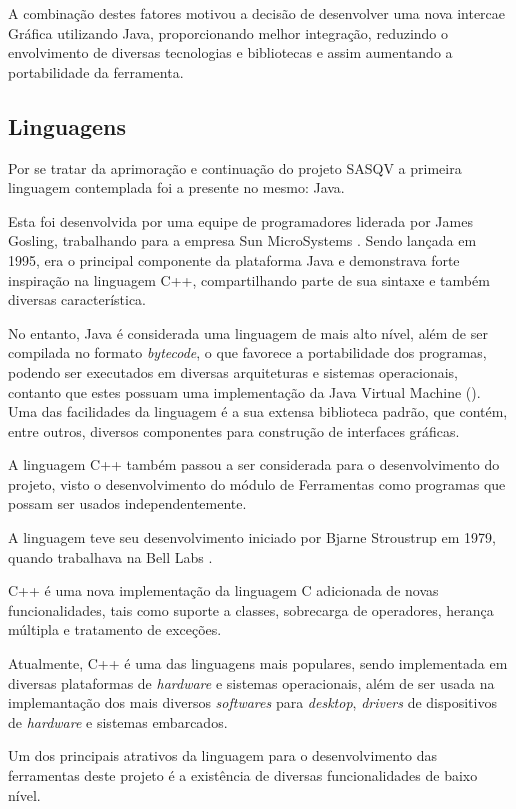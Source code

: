 A combinação destes fatores motivou a decisão de desenvolver uma nova intercae Gráfica utilizando Java, proporcionando melhor integração, reduzindo o envolvimento de diversas tecnologias e bibliotecas e assim aumentando a portabilidade da ferramenta.

\subsection{Linguagens}

Por se tratar da aprimoração e continuação do projeto SASQV a primeira linguagem contemplada foi a presente no mesmo: Java.

Esta foi desenvolvida por uma equipe de programadores liderada por James Gosling, trabalhando para a empresa Sun MicroSystems \cite{wikijava}. Sendo lançada em 1995, era o principal componente da plataforma Java e demonstrava forte inspiração na linguagem C++, compartilhando parte de sua sintaxe e também diversas característica.

No entanto, Java é considerada uma linguagem de mais alto nível, além de ser compilada no formato \emph{bytecode}, o que favorece a portabilidade dos programas, podendo ser executados em diversas arquiteturas e sistemas operacionais, contanto que estes possuam uma implementação da Java Virtual Machine (). Uma das facilidades da linguagem é a sua extensa biblioteca padrão, que contém, entre outros, diversos componentes para construção de interfaces gráficas.

A linguagem C++ também passou a ser considerada para o desenvolvimento do projeto, visto o desenvolvimento do módulo de Ferramentas como programas que possam ser usados independentemente.

A linguagem teve seu desenvolvimento iniciado por Bjarne Stroustrup em 1979, quando trabalhava na Bell Labs \cite{wikicplusplus}.

C++ é uma nova implementação da linguagem C adicionada de novas funcionalidades, tais como suporte a classes, sobrecarga de operadores, herança múltipla e tratamento de exceções.

Atualmente, C++ é uma das linguagens mais populares, sendo implementada em diversas plataformas de \emph{hardware} e sistemas operacionais, além de ser usada na implemantação dos mais diversos \emph{softwares} para \emph{desktop}, \emph{drivers} de dispositivos de \emph{hardware} e sistemas embarcados.

Um dos principais atrativos da linguagem para o desenvolvimento das ferramentas deste projeto é a existência de diversas funcionalidades de baixo nível.

